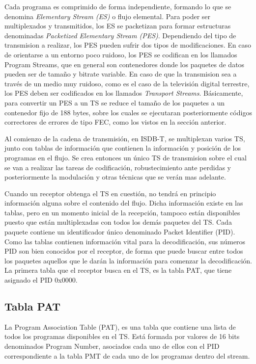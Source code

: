 	Cada programa es comprimido de forma independiente, formando lo que se denomina \textit{Elementary Stream (ES)} o flujo elemental. Para poder ser multiplexados y transmitidos, los ES se packetizan para formar estructuras denominadas \textit{Packetized Elementary Stream (PES)}. Dependiendo del tipo de transmision a realizar, los PES pueden sufrir dos tipos de modificaciones. En caso de orientarse a un entorno poco ruidoso, los PES se codifican en los llamados Program Streams, que en general son contenedores donde los paquetes de datos pueden ser de tamaño y bitrate variable. En caso de que la transmision sea a través de un medio muy ruidoso, como es el caso de la televisión digital terrestre, los PES deben ser codificados en los llamados \textit{Transport Streams}. Básicamente, para convertir un PES a un TS se reduce el tamaño de los paquetes a un contenedor fijo de 188 bytes, sobre los cuales se ejecutaran posteriormente códigos correctores de errores de tipo FEC, como los vistos en la sección anterior.
	
	Al comienzo de la cadena de transmisión, en ISDB-T, se multiplexan varios TS, junto con tablas de información que contienen la información y posición de los programas en el flujo. Se crea entonces un único TS de transmision sobre el cual se van a realizar las tareas de codificación, robustecimiento ante perdidas y posteriormente la modulación y otras técnicas que se verán mas adelante.
	
	Cuando un receptor obtenga el TS en cuestión, no tendrá en principio información alguna sobre el contenido del flujo. Dicha información existe en las tablas, pero en un momento inicial de la recepción, tampoco están disponibles puesto que están multiplexadas con todos los demás paquetes del TS. Cada paquete contiene un identificador único denominado Packet Identifier (PID). Como las tablas contienen información vital para la decodificación, sus números PID son bien conocidos por el receptor, de forma que puede buscar entre todos los paquetes aquellos que le darán la información para comenzar la decodificación. La primera tabla que el receptor busca en el TS, es la tabla PAT, que tiene asignado el PID 0x0000. 
	
	\subsection{Tabla PAT}
	La Program Association Table (PAT), es una tabla que contiene una lista de todos los programas disponibles en el TS. Está formada por valores de 16 bits denominados Program Number, asociados cada uno de ellos con el PID correspondiente a la tabla PMT de cada uno de los programas dentro del stream. 
	
